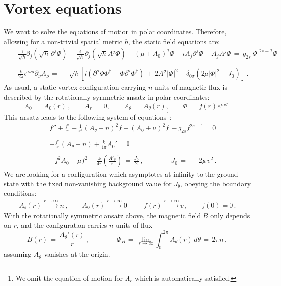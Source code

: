 \documentclass[12pt,a4paper]{article}
\def\be{\begin{equation}}
\def\ee{\end{equation}}
\newcommand{\bea}{\begin{eqnarray}}
\newcommand{\eea}{\end{eqnarray}}
\begin{document}
\section{Vortex equations}
We want to solve the equations of motion in polar coordinates. Therefore, allowing for a non-trivial spatial metric $h$, the static field equations are:
 \bea
        &&\tfrac{1}{\sqrt h}\partial_j \left(\sqrt h\,\partial^j\Phi\right) - \tfrac{i}{\sqrt{h}} \partial_{j} \left(\sqrt{h} A^{j} \Phi \right) + (\mu +A_0)^2 \Phi -i A_{j} \partial^{j} \Phi - A_{j} A^{j} \Phi\, =\, 
  g_{2s} |\Phi|^{2s-2}\Phi \nonumber\\\\\nonumber
        &&\frac{k}{2 \pi} \epsilon^{\sigma \nu \rho} \partial_{\nu} A_{\rho}\, = \,-\sqrt{h}\left[i \left(\partial^{\sigma} \Phi \Phi^{\dag} - \Phi \partial^{\sigma} \Phi^{\dag} \right) \,+\,2 A^{\sigma} \left|\Phi \right|^2- \delta_{0 \sigma} \left(2 \mu \left|\Phi \right|^2 + J_0 \right)\right]\,.
\eea
 As usual, a static vortex configuration carrying $n$ units of magnetic flux is described by the  rotationally symmetric ansatz in polar coordinates: 
\be
            A_0\, =\, A_0(r) \, , \qquad A_r \,=\, 0, \qquad A_{\theta}\, =\, A_\theta(r), 
\qquad \Phi \,= \,f(r)e^{i n \theta}\,.
        \ee
This ansatz leads to the following system of equations\footnote{We omit the equation of motion for $A_r$ which is automatically satisfied.}:
    \bea
&&        f''+\frac{f'}{r} -\frac{1}{r^2}\left(A_\theta - n\right)^2 f + (A_0+\mu)^2 f\, - g_{2s} f^{2s-1} = 0 \label{eq:radial_scalar}  \\\nonumber\\
 &&       -\frac{f^2}{r}\left(A_\theta - n\right)+ \frac{k}{4 \pi} A_0' =0 \label{eq:radial_Atheta}  \\\nonumber\\
 &&       -f^2 A_0 -\mu f^2 + \frac{k}{4 \pi} \left(\frac{A'_\theta}{r}\right)\,=\, \frac{J_0}{2}\,,\qquad \qquad J_0\,=\,-\,2\mu\,v^2\,. \label{eq:radial_A0}
    \eea
We are looking for a configuration which asymptotes at infinity to the ground state with the fixed non-vanishing background value for $J_0$, obeying the boundary conditions:
        \bea
            A_\theta(r) \xrightarrow{r \to \infty} n\,, \qquad A_0(r) \xrightarrow{r \to \infty} 0, \qquad f(r) \xrightarrow{r \to \infty} v\,, \qquad f(0) = 0\,.
        \eea
With the rotationally symmetric ansatz above, the magnetic field $B$ only depends on $r$, and the configuration carries $n$ units of flux:
\be
B(r)\,=\,\frac{A_\theta'(r)}{r}\,,\qquad\qquad
\Phi_B 
\,=\,\lim_{r\to\infty} \int_0^{2 \pi} A_{\theta}(r)\, d\theta \,=\, 2\pi n\,,
\ee
assuming  $A_\theta$ vanishes at the origin.
\end{document}
